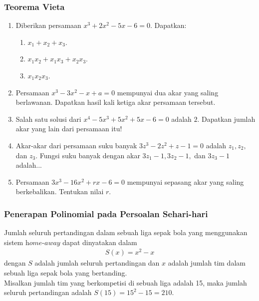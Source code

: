 \documentclass[11pt]{beamer}
\begin{document}
	\begin{frame}
		\frametitle{Teorema Vieta}
		
		\begin{enumerate}
			\item Diberikan persamaan $x^3+2x^2-5x-6=0$. Dapatkan:
			\begin{enumerate}
				\item $x_1+x_2+x_3$.
				\item $x_1x_2+x_1x_3+x_2x_3$.
				\item $x_1x_2x_3$.
				
			\end{enumerate}
			\item Persamaan $x^3-3x^2-x+a=0$ mempunyai dua akar yang saling berlawanan. Dapatkan hasil kali ketiga akar persamaan tersebut.
			\item Salah satu solusi dari $x^4-5x^3+5x^2+5x-6=0$ adalah $2$. Dapatkan jumlah akar yang lain dari persamaan itu!
			\item Akar-akar dari persamaan suku banyak $3z^3-2z^2+z-1=0$ adalah $z_1, z_2,$ dan $z_3$. Fungsi suku banyak dengan akar $3z_1-1, 3z_2-1,$ dan $3z_3-1$ adalah...
			\item Persamaan $3x^3-16x^2+rx-6=0$ mempunyai sepasang akar yang saling berkebalikan. Tentukan nilai $r$.
		\end{enumerate}	
	\end{frame}
	
	
	\begin{frame}
		\frametitle{Penerapan Polinomial pada Persoalan Sehari-hari}
		Jumlah seluruh pertandingan dalam sebuah liga sepak bola yang menggunakan sistem $\textit{home-away}$ dapat dinyatakan dalam 
		\begin{align}
			S(x)=x^2-x \label{jmlpert}
		\end{align}
		dengan $S$ adalah jumlah seluruh pertandingan dan $x$ adalah jumlah tim dalam sebuah liga sepak bola yang bertanding.\\ Misalkan jumlah tim yang berkompetisi di sebuah liga adalah 15, maka jumlah seluruh pertandingan adalah $S(15)=15^2-15=210.$
	\end{frame}
	
\end{document}
